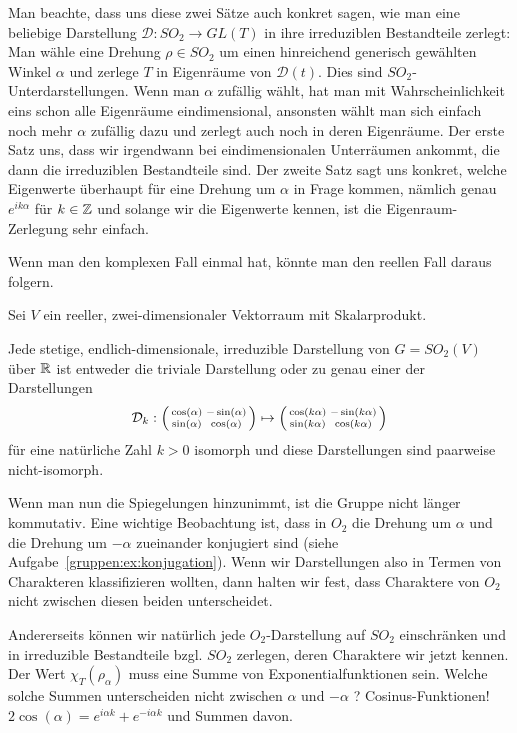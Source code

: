 \begin{remark}
Man beachte, dass uns diese zwei Sätze auch konkret sagen, wie man eine beliebige Darstellung $\mathcal{D}:SO_2\to GL(T)$ in ihre irreduziblen Bestandteile zerlegt: Man wähle eine Drehung $\rho\in SO_2$ um einen hinreichend generisch gewählten Winkel $\alpha$ und zerlege $T$ in Eigenräume von $\mathcal{D}(t)$. Dies sind $SO_2$-Unterdarstellungen. Wenn man $\alpha$ zufällig wählt, hat man mit Wahrscheinlichkeit eins schon alle Eigenräume eindimensional, ansonsten wählt man sich einfach noch mehr $\alpha$ zufällig dazu und zerlegt auch noch in deren Eigenräume. Der erste Satz uns, dass wir irgendwann bei eindimensionalen Unterräumen ankommt, die dann die irreduziblen Bestandteile sind. Der zweite Satz sagt uns konkret, welche Eigenwerte überhaupt für eine Drehung um $\alpha$ in Frage kommen, nämlich genau $e^{ik\alpha}$ für $k\in\mathbb{Z}$ und solange wir die Eigenwerte kennen, ist die Eigenraum-Zerlegung sehr einfach.
\end{remark}

\begin{remark}
Wenn man den komplexen Fall einmal hat, könnte man den reellen Fall daraus folgern.
\end{remark}

\begin{corollary}[Darstellungstheorie von $SO_2$ über $\IK=\IR$]
Sei $V$ ein reeller, zwei-dimensionaler Vektorraum mit Skalarprodukt.

Jede stetige, endlich-dimensionale, irreduzible Darstellung von $G=SO_2(V)$ über $\mathbb{R}$ ist entweder die triviale Darstellung oder zu genau einer der Darstellungen
\[\mathcal{D}_k : \begin{psmallmatrix}\cos(\alpha)&-\sin(\alpha)\\\sin(\alpha)&\cos(\alpha)\end{psmallmatrix} \mapsto \begin{psmallmatrix}\cos(k\alpha)&-\sin(k\alpha)\\\sin(k\alpha)&\cos(k\alpha)\end{psmallmatrix}\]
für eine natürliche Zahl $k>0$ isomorph und diese Darstellungen sind paarweise nicht-isomorph.
\end{corollary}

\begin{remark}
Wenn man nun die Spiegelungen hinzunimmt, ist die Gruppe nicht länger kommutativ. Eine wichtige Beobachtung ist, dass in $O_2$ die Drehung um $\alpha$ und die Drehung um $-\alpha$ zueinander konjugiert sind (siehe Aufgabe~\ref{gruppen:ex:konjugation}). Wenn wir Darstellungen also in Termen von Charakteren klassifizieren wollten, dann halten wir fest, dass Charaktere von $O_2$ nicht zwischen diesen beiden unterscheidet.

Andererseits können wir natürlich jede $O_2$-Darstellung auf $SO_2$ einschränken und in irreduzible Bestandteile bzgl. $SO_2$ zerlegen, deren Charaktere wir jetzt kennen. Der Wert $\chi_T(\rho_\alpha)$ muss eine Summe von Exponentialfunktionen sein. Welche solche Summen unterscheiden nicht zwischen $\alpha$ und $-\alpha$ ? Cosinus-Funktionen! $2\cos(\alpha) = e^{i\alpha k} + e^{-i\alpha k}$ und Summen davon.
\end{remark}

